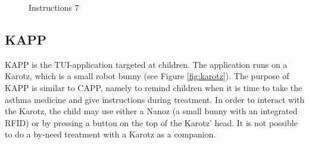 \begin{figure}[H]
	\begin{minipage}[b]{0.3\linewidth}
		\centering
		\caption{Instructions 7}
		\label{fig:instructions-7}
	\end{minipage}
\end{figure}


\subsection{KAPP}
\label{sec:description-kapp}
KAPP is the TUI-application targeted at children. The application runs on a Karotz, which is a small robot bunny (see Figure \ref{fig:karotz}). The purpose of KAPP is similar to CAPP, namely to remind children when it is time to take the asthma medicine and give instructions during treatment. In order to interact with the Karotz, the child may use either a Nanoz (a small bunny with an integrated RFID) or by pressing a button on the top of the Karotz' head. It is not possible to do a by-need treatment with a Karotz as a companion. 


